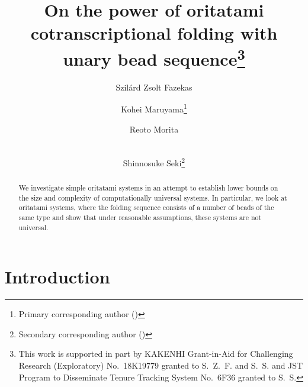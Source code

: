 \documentclass[runningheads]{llncs}
\title{On the power of oritatami cotranscriptional folding with unary bead sequence\thanks{This work is supported in part by KAKENHI Grant-in-Aid for Challenging Research (Exploratory) No.~18K19779 granted to S.~Z.~F. and S.~S. and JST Program to Disseminate Tenure Tracking System No.~6F36 granted to S.~S.}
}
\author{
Szil\'{a}rd Zsolt Fazekas\inst{1} \and 
Kohei Maruyama\thanks{Primary corresponding author (\email{k.maruyama@uec.ac.jp})} \and
Reoto Morita \and \\
Shinnosuke Seki\inst{2}\thanks{Secondary corresponding author (\email{s.seki@uec.ac.jp})}
}
\institute{
Akita University, 
Graduate School of Engineering Science, 
1-1 Tegate Gakuen-machi, Akita, 0108502, Japan \\
\and
The University of Electro-Communications, 
Graduate School of Informatics and Engineering, 
1-5-1 Chofugaoka, Chofu, Tokyo, 1828585, Japan \\
}
\begin{document}
\maketitle

\begin{abstract}
We investigate simple oritatami systems in an attempt to establish lower bounds on the size and complexity of computationally universal systems. 
In particular, we look at oritatami systems, where the folding sequence consists of a number of beads of the same type and show that under reasonable assumptions, these systems are not universal.
\end{abstract}

	\section{Introduction}
\end{document}
